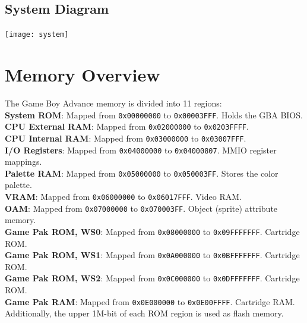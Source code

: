 \documentclass[11pt,a4paper,draft]{article}
\begin{document}
	
	
	\subsection{System Diagram}
	\texttt{[image: system]}
	
	\section{Memory Overview}
	The Game Boy Advance memory is divided into 11 regions:\\
	\textbf{System ROM}: Mapped from \texttt{0x00000000} to \texttt{0x00003FFF}. Holds the GBA BIOS.\\
	\textbf{CPU External RAM}: Mapped from \texttt{0x02000000} to \texttt{0x0203FFFF}.\\
	\textbf{CPU Internal RAM}: Mapped from \texttt{0x03000000} to \texttt{0x03007FFF}.\\
	\textbf{I/O Registers}: Mapped from \texttt{0x04000000} to \texttt{0x04000807}. MMIO register mappings.\\
	\textbf{Palette RAM}: Mapped from \texttt{0x05000000} to \texttt{0x050003FF}. Stores the color palette.\\
	\textbf{VRAM}: Mapped from \texttt{0x06000000} to \texttt{0x06017FFF}. Video RAM.\\
	\textbf{OAM}: Mapped from \texttt{0x07000000} to \texttt{0x070003FF}. Object (sprite) attribute memory.\\
	\textbf{Game Pak ROM, WS0}: Mapped from \texttt{0x08000000} to \texttt{0x09FFFFFFF}. Cartridge ROM.\\
	\textbf{Game Pak ROM, WS1}: Mapped from \texttt{0x0A000000} to \texttt{0x0BFFFFFFF}. Cartridge ROM.\\
	\textbf{Game Pak ROM, WS2}: Mapped from \texttt{0x0C000000} to \texttt{0x0DFFFFFFF}. Cartridge ROM.\\
	\textbf{Game Pak RAM}: Mapped from \texttt{0x0E000000} to \texttt{0x0E00FFFF}. Cartridge RAM.\cite{GBAManual}\\
	
	Additionally, the upper 1M-bit of each ROM region is used as flash memory.
	
\end{document}

